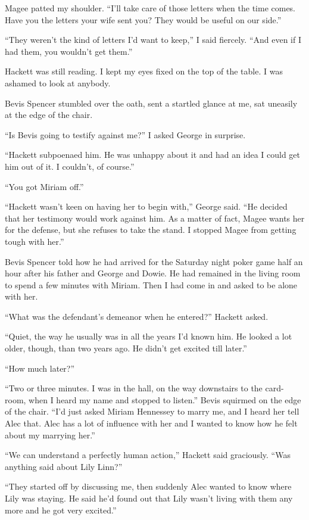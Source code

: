 \documentclass{novel}
\begin{document}
Magee patted my shoulder. “I’ll take care of those letters when the time comes. Have you the letters your wife sent you? They would be useful on our side.”

“They weren’t the kind of letters I’d want to keep,” I said fiercely. “And even if I had them, you wouldn’t get them.”

Hackett was still reading. I kept my eyes fixed on the top of the table. I was ashamed to look at anybody.

\scenestars

Bevis Spencer stumbled over the oath, sent a startled glance at me, sat uneasily at the edge of the chair.

“Is Bevis going to testify against me?” I asked George in surprise.

“Hackett subpoenaed him. He was unhappy about it and had an idea I could get him out of it. I couldn’t, of course.”

“You got Miriam off.”

“Hackett wasn’t keen on having her to begin with,” George said. “He decided that her testimony would work against him. As a matter of fact, Magee wants her for the defense, but she refuses to take the stand. I stopped Magee from getting tough with her.”

Bevis Spencer told how he had arrived for the Saturday night poker game half an hour after his father and George and Dowie. He had remained in the living room to spend a few minutes with Miriam. Then I had come in and asked to be alone with her.

“What was the defendant’s demeanor when he entered?” Hackett asked.

“Quiet, the way he usually was in all the years I’d known him. He looked a lot older, though, than two years ago. He didn’t get excited till later.”

“How much later?”

“Two or three minutes. I was in the hall, on the way downstairs to the card-room, when I heard my name and stopped to listen.” Bevis squirmed on the edge of the chair. “I’d just asked Miriam Hennessey to marry me, and I heard her tell Alec that. Alec has a lot of influence with her and I wanted to know how he felt about my marrying her.”

“We can understand a perfectly human action,” Hackett said graciously. “Was anything said about Lily Linn?”

“They started off by discussing me, then suddenly Alec wanted to know where Lily was staying. He said he’d found out that Lily wasn’t living with them any more and he got very excited.”
\end{document}
